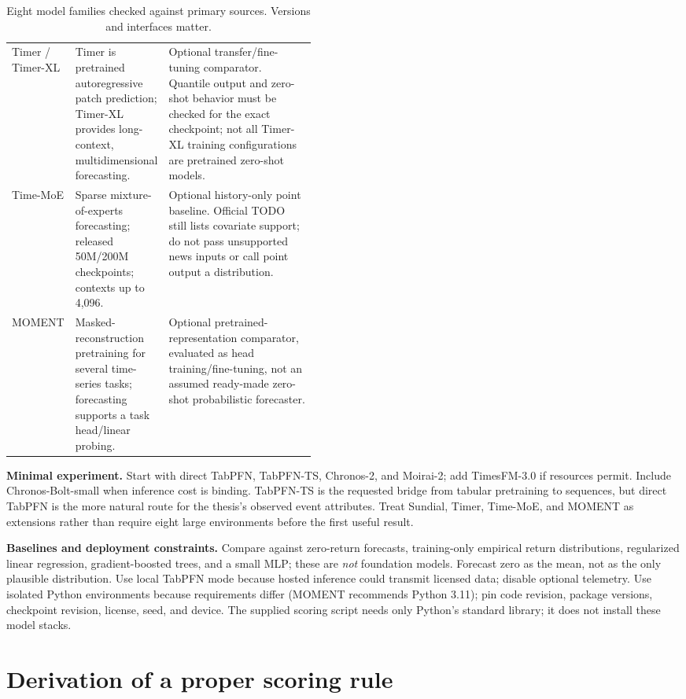 \documentclass[11pt,letterpaper]{article}
\begin{document}
\begin{table}[htbp]
\begin{tabularx}{\linewidth}{@{}P{0.17\linewidth}P{0.28\linewidth}Y@{}}
Timer / Timer-XL \cite{timer} & Timer is pretrained autoregressive patch prediction; Timer-XL provides long-context, multidimensional forecasting. & Optional transfer/fine-tuning comparator. Quantile output and zero-shot behavior must be checked for the exact checkpoint; not all Timer-XL training configurations are pretrained zero-shot models. \\
Time-MoE \cite{timemoe} & Sparse mixture-of-experts forecasting; released 50M/200M checkpoints; contexts up to 4,096. & Optional history-only point baseline. Official TODO still lists covariate support; do not pass unsupported news inputs or call point output a distribution. \\
MOMENT \cite{moment} & Masked-reconstruction pretraining for several time-series tasks; forecasting supports a task head/linear probing. & Optional pretrained-representation comparator, evaluated as head training/fine-tuning, not an assumed ready-made zero-shot probabilistic forecaster. \\
\bottomrule
\end{tabularx}
\caption{Eight model families checked against primary sources. Versions and interfaces matter.}
\label{tab:models}
\end{table}

\textbf{Minimal experiment.} Start with direct TabPFN, TabPFN-TS, Chronos-2, and Moirai-2; add TimesFM-3.0 if resources permit. Include Chronos-Bolt-small when inference cost is binding. TabPFN-TS is the requested bridge from tabular pretraining to sequences, but direct TabPFN is the more natural route for the thesis's observed event attributes. Treat Sundial, Timer, Time-MoE, and MOMENT as extensions rather than require eight large environments before the first useful result.

\textbf{Baselines and deployment constraints.} Compare against zero-return forecasts, training-only empirical return distributions, regularized linear regression, gradient-boosted trees, and a small MLP; these are \emph{not} foundation models. Forecast zero as the mean, not as the only plausible distribution. Use local TabPFN mode because hosted inference could transmit licensed data; disable optional telemetry. Use isolated Python environments because requirements differ (MOMENT recommends Python 3.11); pin code revision, package versions, checkpoint revision, license, seed, and device. The supplied scoring script needs only Python's standard library; it does not install these model stacks.

\section{Derivation of a proper scoring rule}
\end{document}
